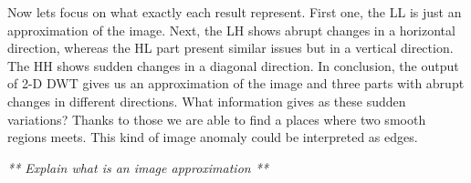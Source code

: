 Now lets focus on what exactly each result represent. First one, the LL is just an approximation of the image. Next, the LH shows abrupt changes in a horizontal direction, whereas the HL part present similar issues but in a vertical direction. The HH shows sudden changes in a diagonal direction. In conclusion, the output of 2-D DWT gives us an approximation of the image and three parts with abrupt changes in different directions. What information gives as these sudden variations? Thanks to those we are able to find a places where two smooth regions meets. This kind of image anomaly could be interpreted as edges.

\textit{** Explain what is an image approximation **}


